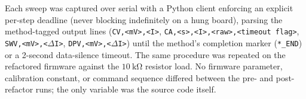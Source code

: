 Each sweep was captured over serial with a Python client enforcing an
explicit per-step deadline (never blocking indefinitely on a hung board),
parsing the method-tagged output lines (\texttt{CV,<mV>,<I>},
\texttt{CA,<s>,<I>,<raw>,<timeout flag>}, \texttt{SWV,<mV>,<$\Delta$I>},
\texttt{DPV,<mV>,<$\Delta$I>}) until the method's completion marker
(\texttt{*\_END}) or a 2-second data-silence timeout. The same procedure
was repeated on the refactored firmware against the $\SI{10}{\kilo\ohm}$
resistor load. No firmware parameter, calibration constant, or command
sequence differed between the pre- and post-refactor runs; the only
variable was the source code itself.
